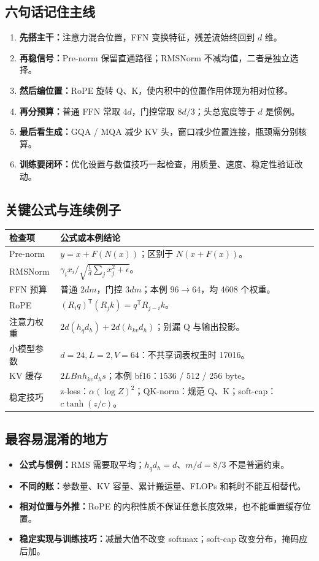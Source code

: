 \documentclass[UTF8,fontset=fandol,zihao=-4,a4paper]{ctexart}
\begin{document}
\subsection{六句话记住主线}
\begin{enumerate}
\item \textbf{先搭主干：}注意力混合位置，FFN 变换特征，残差流始终回到 $d$ 维。
\item \textbf{再稳信号：}Pre-norm 保留直通路径；RMSNorm 不减均值，二者是独立选择。
\item \textbf{然后编位置：}RoPE 旋转 Q、K，使内积中的位置作用体现为相对位移。
\item \textbf{再分预算：}普通 FFN 常取 $4d$，门控常取 $8d/3$；头总宽度等于 $d$ 是惯例。
\item \textbf{最后看生成：}GQA / MQA 减少 KV 头，窗口减少位置连接，瓶颈需分别核算。
\item \textbf{训练要闭环：}优化设置与数值技巧一起检查，用质量、速度、稳定性验证改动。
\end{enumerate}

\subsection{关键公式与连续例子}
\par\noindent\begin{tabularx}{\linewidth}{@{}P{24mm}Y@{}}
\toprule
检查项 & 公式或本例结论\\
\midrule
Pre-norm & $y=x+F(N(x))$；区别于 $N(x+F(x))$。\\
RMSNorm & $\gamma_i x_i/\sqrt{\frac1d\sum_jx_j^2+\epsilon}$。\\
FFN 预算 & 普通 $2dm$，门控 $3dm$；本例 $96\to64$，均 4608 个权重。\\
RoPE & $(R_iq)^{\mathsf T}(R_jk)=q^{\mathsf T}R_{j-i}k$。\\
注意力权重 & $2d(h_qd_h)+2d(h_{kv}d_h)$；别漏 Q 与输出投影。\\
小模型参数 & $d=24,L=2,V=64$：不共享词表权重时 17016。\\
KV 缓存 & $2LBnh_{kv}d_hs$；本例 bf16：1536 / 512 / 256 byte。\\
稳定技巧 & z-loss：$\alpha(\log Z)^2$；QK-norm：规范 Q、K；soft-cap：$c\tanh(z/c)$。\\
\bottomrule
\end{tabularx}

\subsection{最容易混淆的地方}
\begin{itemize}
\item \textbf{公式与惯例：}RMS 需要取平均；$h_qd_h=d$、$m/d=8/3$ 不是普遍约束。
\item \textbf{不同的账：}参数量、KV 容量、累计搬运量、FLOPs 和耗时不能互相替代。
\item \textbf{相对位置与外推：}RoPE 的内积性质不保证任意长度效果，也不能重置缓存位置。
\item \textbf{稳定实现与训练技巧：}减最大值不改变 softmax；soft-cap 改变分布，掩码应后加。
\end{itemize}
\end{document}
